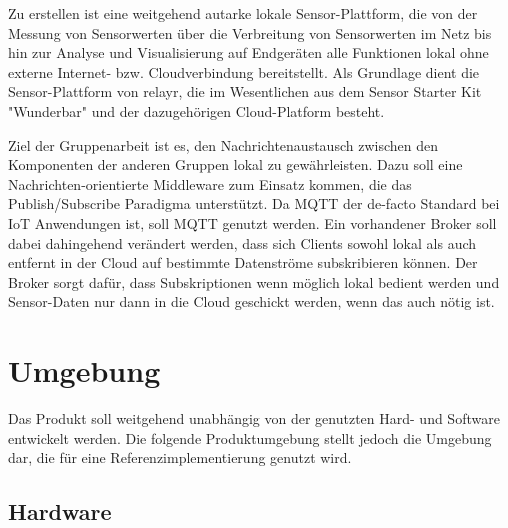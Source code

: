 \documentclass[fontsize=11pt,a4paper]{scrartcl}
\begin{document}
Zu erstellen ist eine weitgehend autarke lokale Sensor-Plattform, die von der Messung von Sensorwerten über die Verbreitung von Sensorwerten im Netz bis hin zur Analyse und Visualisierung auf Endgeräten alle Funktionen lokal ohne externe Internet- bzw. Cloudverbindung bereitstellt.
Als Grundlage dient die Sensor-Plattform von relayr, die im Wesentlichen aus dem Sensor Starter Kit "Wunderbar" und der dazugehörigen Cloud-Platform besteht.


Ziel der Gruppenarbeit ist es, den Nachrichtenaustausch zwischen den Komponenten der anderen Gruppen lokal zu gewährleisten.
Dazu soll eine Nachrichten-orientierte Middleware zum Einsatz kommen, die das Publish/Subscribe Paradigma unterstützt.
Da MQTT der de-facto Standard bei IoT Anwendungen ist, soll MQTT genutzt werden.
Ein vorhandener Broker soll dabei dahingehend verändert werden, dass sich Clients sowohl lokal als auch entfernt in der Cloud auf bestimmte Datenströme subskribieren können.
Der Broker sorgt dafür, dass Subskriptionen wenn möglich lokal bedient werden und Sensor-Daten nur dann in die Cloud geschickt werden, wenn das auch nötig ist.

\section{Umgebung}

Das Produkt soll weitgehend unabhängig von der genutzten Hard- und Software entwickelt werden.
Die folgende Produktumgebung stellt jedoch die Umgebung dar, die für eine Referenzimplementierung genutzt wird.

\subsection{Hardware}
\end{document}

